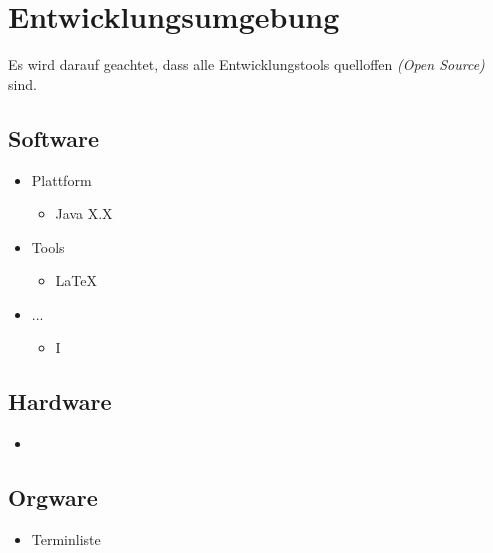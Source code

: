 \section{Entwicklungsumgebung}


Es wird darauf geachtet, dass alle Entwicklungstools quelloffen \textit{(Open Source)} sind.

\subsection{Software}

\begin{itemize}
  \item Plattform
    \begin{itemize}
      \item Java X.X
    \end{itemize}
  \item Tools
    \begin{itemize}
      \item \LaTeX
    \end{itemize}
  \item ...
    \begin{itemize}
      \item I
    \end{itemize}
\end{itemize}

\subsection{Hardware}

\begin{itemize}
  \item
\end{itemize}

\subsection{Orgware}

\begin{itemize}
  \item Terminliste
\end{itemize}
